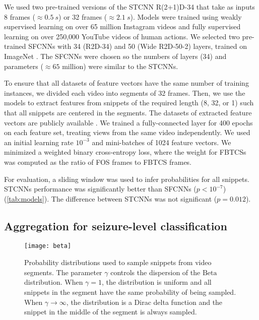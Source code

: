 We used two pre-trained versions of the \ac{STCNN} R(2+1)D-34 \cite{ghadiyaram_large-scale_2019} that take as inputs 8 frames ($\approx \SI{0.5}{s}$) or 32 frames ($\approx \SI{2.1}{s}$).
Models were trained using weakly supervised learning on over 65 million Instagram videos and fully supervised learning on over 250,000 YouTube videos of human actions.
We selected two pre-trained \acp{SFCNN} with 34 (R2D-34) and 50 (Wide R2D-50-2) layers, trained on ImageNet \cite{zagoruyko_wide_2016}.
The \acp{SFCNN} were chosen so the numbers of layers (34) and parameters ($\approx 65$ million) were similar to the \acp{STCNN}.

To ensure that all datasets of feature vectors have the same number of training instances, we divided each video into segments of 32 frames.
Then, we use the models to extract features from snippets of the required length (8, 32, or 1) such that all snippets are centered in the segments.
The datasets of extracted feature vectors are publicly available \cite{perez-garcia_data_2021}.
We trained a fully-connected layer for 400 epochs on each feature set, treating views from the same video independently.
We used an initial learning rate $10 ^ {-3}$ and mini-batches of 1024 feature vectors.
We minimized a weighted binary cross-entropy loss, where the weight for \acp{FBTCS} was computed as the ratio of \ac{FOS} frames to \ac{FBTCS} frames.

For evaluation, a sliding window was used to infer probabilities for all snippets.
\acp{STCNN} performance was significantly better than \acp{SFCNN} ($p < 10 ^ {-7}$) (\cref{tab:models}).
The difference between \acp{STCNN} was not significant ($p = 0.012$).


\subsection{Aggregation for seizure-level classification}
\label{sec:exp_agg}

\begin{figure}
  \centering
  \texttt{[image: beta]}
  \caption[Probability distributions to sample snippets from video segments]{
    Probability distributions used to sample snippets from video segments.
    The parameter $\gamma$ controls the dispersion of the $\text{Beta}$ distribution.
    When $\gamma = 1$, the distribution is uniform and all snippets in the segment have the same probability of being sampled.
    When $\gamma \rightarrow \infty$, the distribution is a Dirac delta function and the snippet in the middle of the segment is always sampled.
  }
  \label{fig:betas}
\end{figure}



